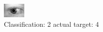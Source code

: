 \begin{figure}[h!]
\begin{center}
\includegraphics[width=0.60\columnwidth]{figures/ID848_class_2_target_4.png}
\end{center}
\caption{ Classification: 2 actual target: 4}
\label{fig:ID848_class_2_target_4}
\end{figure}
